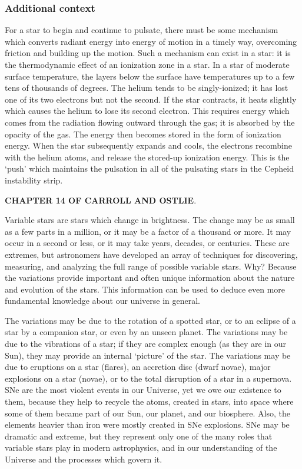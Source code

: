 \documentclass[a4paper,10pt]{article}
\begin{document}
\subsubsection{Additional context}

{\noindent}For a star to begin and continue to pulsate, there must be some mechanism which converts radiant energy into energy of motion in a timely way, overcoming friction and building up the motion. Such a mechanism can exist in a star: it is the thermodynamic effect of an ionization zone in a star. In a star of moderate surface temperature, the layers below the surface have temperatures up to a few tens of thousands of degrees. The helium tends to be singly-ionized; it has lost one of its two electrons but not the second. If the star contracts, it heats slightly which causes the helium to lose its second electron. This requires energy which comes from the radiation flowing outward through the gas; it is absorbed by the opacity of the gas. The energy then becomes stored in the form of ionization energy. When the star subsequently expands and cools, the electrons recombine with the helium atoms, and release the stored-up ionization energy. This is the `push' which maintains the pulsation in all of the pulsating stars in the Cepheid instability strip.

{\noindent}\textbf{CHAPTER 14 OF CARROLL AND OSTLIE}.

{\noindent}Variable stars are stars which change in brightness. The change may be as small as a few parts in a million, or it may be a factor of a thousand or more. It may occur in a second or less, or it may take years, decades, or centuries. These are extremes, but astronomers have developed an array of techniques for discovering, measuring, and analyzing the full range of possible variable stars. Why? Because the variations provide important and often unique information about the nature and evolution of the stars. This information can be used to deduce even more fundamental knowledge about our universe in general.

{\noindent}The variations may be due to the rotation of a spotted star, or to an eclipse of a star by a companion star, or even by an unseen planet. The variations may be due to the vibrations of a star; if they are complex enough (as they are in our Sun), they may provide an internal `picture' of the star. The variations may be due to eruptions on a star (flares), an accretion disc (dwarf novae), major explosions on a star (novae), or to the total disruption of a star in a supernova. SNe are the most violent events in our Universe, yet we owe our existence to them, because they help to recycle the atoms, created in stars, into space where some of them became part of our Sun, our planet, and our biosphere. Also, the elements heavier than iron were mostly created in SNe explosions. SNe may be dramatic and extreme, but they represent only one of the many roles that variable stars play in modern astrophysics, and in our understanding of the Universe and the processes which govern it.
\end{document}
